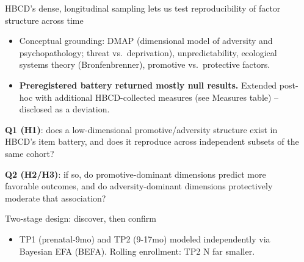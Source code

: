 \documentclass[final]{beamer}
\newlength{\sepwidth}
\newlength{\colwidth}
\newcommand{\separatorcolumn}{\begin{column}{\sepwidth}\end{column}}
\begin{document}
\begin{frame}[t]
\vspace{-0.5cm}
\begin{columns}[t]
\separatorcolumn

\begin{column}{\colwidth}
  \begin{block}{HBCD's dense, longitudinal sampling lets us test reproducibility of factor structure across time}
    \vspace{-0.3cm}
    \begin{itemize}
      \setlength\itemsep{0.15em}
      \item Conceptual grounding: DMAP (dimensional model of
        adversity and psychopathology; threat vs.\ deprivation), unpredictability, 
        ecological systems theory (Bronfenbrenner), promotive vs.\
        protective factors.
      \item \textbf{Preregistered battery returned mostly null
        results.} Extended post-hoc with additional HBCD-collected
        measures (see Measures table) -- disclosed as a deviation.
    \end{itemize}

    \vspace{-0.4cm}
    \begin{tcolorbox}[colback=coolgray, colframe=coolgray, width=\linewidth]
      \color{white}
      \textbf{Q1 (H1)}: does a low-dimensional promotive/adversity
      structure exist in HBCD's item battery, and does it reproduce
      across independent subsets of the same cohort?

      \vspace{0.1cm}
      \textbf{Q2 (H2/H3)}: if so, do promotive-dominant dimensions
      predict more favorable outcomes, and do adversity-dominant
      dimensions protectively moderate that association?
    \end{tcolorbox}
  \end{block}

  \vspace{-0.5cm}
  \begin{block}{Two-stage design: discover, then confirm}
    \vspace{-0.2cm}
    \begin{itemize}
      \setlength\itemsep{0.15em}
      \item TP1 (prenatal-9mo) and TP2 (9-17mo) modeled independently
        via Bayesian EFA (BEFA). Rolling enrollment: TP2 N far smaller.
    \end{itemize}


\end{block}
\end{column}
\end{columns}
\end{frame}
\end{document}
